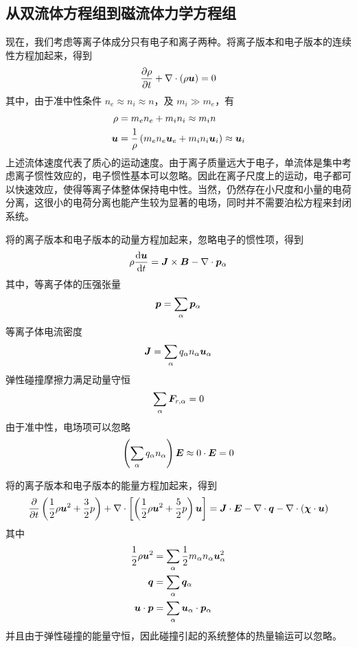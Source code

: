 \subsection{从双流体方程组到磁流体力学方程组}

现在，我们考虑等离子体成分只有电子和离子两种。将离子版本和电子版本的连续性方程加起来，得到
\begin{equation}
\frac{\partial {\rho}}{\partial {t}} + \nabla \cdot {\left(\rho \bm{u}\right)} = 0
\end{equation}
其中，由于准中性条件 $n_e \approx n_i \approx n$，及 $m_i \gg m_e$，有
\begin{align}
\rho &= m_e n_e + m_i n_i \approx m_i n \\
\bm{u} &= \frac{1}{\rho} \left( m_e n_e \bm{u}_e + m_i n_i \bm{u}_i \right)
\approx \bm{u}_i
\end{align}
上述流体速度代表了质心的运动速度。由于离子质量远大于电子，单流体是集中考虑离子惯性效应的，电子惯性基本可以忽略。因此在离子尺度上的运动，电子都可以快速效应，使得等离子体整体保持电中性。当然，仍然存在小尺度和小量的电荷分离，这很小的电荷分离也能产生较为显著的电场，同时并不需要泊松方程来封闭系统。

将的离子版本和电子版本的动量方程加起来，忽略电子的惯性项，得到
\begin{equation}
\rho \frac{\mathop{}\!\mathrm{d} {\bm{u}}}{\mathop{}\!\mathrm{d} {t}} = \bm{J} \times \bm{B} - \nabla \cdot {\bm{p}_\alpha}
\end{equation}
其中，等离子体的压强张量
\begin{equation}
    \bm{p} = \sum_\alpha \bm{p}_\alpha
\end{equation}
等离子体电流密度
\begin{equation}
    \bm{J} = \sum_\alpha q_\alpha n_\alpha \bm{u}_\alpha
\end{equation}
弹性碰撞摩擦力满足动量守恒
\begin{equation}
    \sum_\alpha \bm{F}_{r,\alpha} = 0
\end{equation}
由于准中性，电场项可以忽略
\begin{equation}
    \left( \sum_\alpha q_\alpha n_\alpha \right) \bm{E} \approx 0 \cdot \bm{E} = 0
\end{equation}

将的离子版本和电子版本的能量方程加起来，得到
\begin{equation}
\frac{\partial {}}{\partial {t}} \left(
    \frac{1}{2} \rho \bm{u}^2 + \frac{3}{2} p
\right)
+ \nabla \cdot {\left[\left(\frac{1}{2} \rho \bm{u}^2 + \frac{5}{2} p \right) \bm{u} \right]}
= \bm{J} \cdot \bm{E}
- \nabla \cdot {\bm{q}} - \nabla \cdot {(\bm{\chi} \cdot \bm{u})}
\end{equation}
其中
\begin{align}
\frac{1}{2} \rho \bm{u}^2 &= \sum_\alpha \frac{1}{2} m_\alpha n_\alpha \bm{u}_\alpha^2 \\
\bm{q} &= \sum_\alpha \bm{q}_\alpha \\
\bm{u} \cdot \bm{p} &= \sum_\alpha \bm{u}_\alpha \cdot \bm{p}_\alpha
\end{align}
并且由于弹性碰撞的能量守恒，因此碰撞引起的系统整体的热量输运可以忽略。

